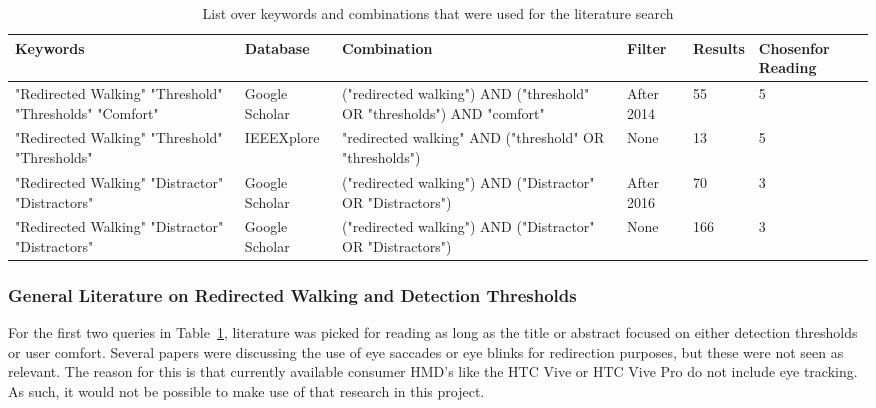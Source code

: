 \begin{table}[h!]
\centering
\begin{tabularx}{\textwidth}{|m{2cm}|m{1.7cm}|m{2.7cm}|m{1.5cm}|m{1.20cm}|m{3.375cm}|} 
\hline
Keywords & Database & Combination & Filter & Results & Chosen\newline for Reading\\ 
\hline
"Redirected Walking"\newline
"Threshold"\newline
"Thresholds"\newline
"Comfort"& Google Scholar & ("redirected walking") AND ("threshold" OR "thresholds") AND "comfort" & After 2014 & 55 & 5\\ 
\hline
"Redirected Walking"\newline
"Threshold"\newline
"Thresholds" & IEEEXplore & "redirected walking" AND ("threshold" OR "thresholds") & None & 13 & 5\\ 
\hline
"Redirected Walking"\newline
"Distractor"\newline
"Distractors" & Google Scholar & ("redirected walking") AND ("Distractor" OR "Distractors") & After 2016 & 70 & 3\\
\hline
"Redirected Walking"\newline
"Distractor"\newline
"Distractors" & Google Scholar & ("redirected walking") AND ("Distractor" OR "Distractors") & None & 166 & 3\\
\hline
\end{tabularx}
\caption{List over keywords and combinations that were used for the literature search}
\label{table:literaturekeywords}
\end{table}

\subsubsection{General Literature on Redirected Walking and Detection Thresholds}
For the first two queries in Table~\ref{table:literaturekeywords}, literature was picked for reading as long as the title or abstract focused on either detection thresholds or user comfort. Several papers were discussing the use of eye saccades or eye blinks for redirection purposes, but these were not seen as relevant. The reason for this is that currently available consumer HMD's like the HTC Vive or HTC Vive Pro do not include eye tracking. As such, it would not be possible to make use of that research in this project.

